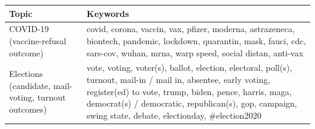 \begin{tabular}{p{}p{}}
\toprule
Topic & Keywords \\
\midrule
COVID-19 \newline (vaccine-refusal outcome) & covid, corona, vaccin, vax, pfizer, moderna, astrazeneca, biontech, pandemic, lockdown, quarantin, mask, fauci, cdc, sars-cov, wuhan, mrna, warp speed, social distan, anti-vax \\
\midrule
Elections \newline (candidate, mail-voting, turnout outcomes) & vote, voting, voter(s), ballot, election, electoral, poll(s), turnout, mail-in / mail in, absentee, early voting, register(ed) to vote, trump, biden, pence, harris, maga, democrat(s) / democratic, republican(s), gop, campaign, swing state, debate, electionday, \#election2020 \\
\bottomrule
\end{tabular}